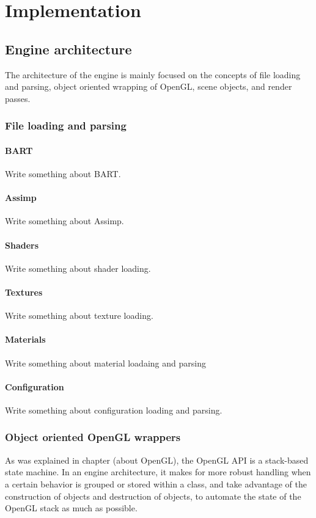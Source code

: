 \section{Implementation}

\subsection{Engine architecture}
The architecture of the engine is mainly focused on the concepts of file loading and parsing, object oriented wrapping of OpenGL, scene objects, and render passes.

\subsubsection{File loading and parsing}
\paragraph{BART}
Write something about BART.
\paragraph{Assimp}
Write something about Assimp.
\paragraph{Shaders}
Write something about shader loading.
\paragraph{Textures}
Write something about texture loading.
\paragraph{Materials}
Write something about material loadaing and parsing
\paragraph{Configuration}
Write something about configuration loading and parsing.

\subsubsection{Object oriented OpenGL wrappers}
As was explained in chapter (about OpenGL), the OpenGL API is a stack-based state machine. In an engine architecture, it makes for more robust handling when a certain behavior is grouped or stored within a class, and take advantage of the construction of objects and destruction of objects, to automate the state of the OpenGL stack as much as possible.

